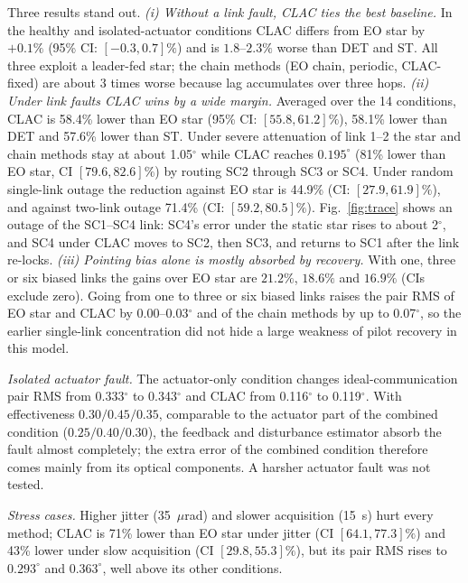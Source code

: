 \documentclass[journal]{IEEEtran}
\begin{document}
\begin{table}[!t]
\caption{CLAC minus baseline: paired change in pair RMS (\%), mean [95\% CI]. Negative values favour CLAC.}
\label{tab:contrast}
\centering\scriptsize

\end{table}

Three results stand out.
\emph{(i) Without a link fault, CLAC ties the best baseline.} In the healthy and isolated-actuator conditions CLAC differs from EO star by $+0.1\%$ (95\% CI: $[-0.3,0.7]\%$) and is $1.8$--$2.3\%$ worse than DET and ST. All three exploit a leader-fed star; the chain methods (EO chain, periodic, CLAC-fixed) are about 3 times worse because lag accumulates over three hops.
\emph{(ii) Under link faults CLAC wins by a wide margin.} Averaged over the 14 conditions, CLAC is 58.4\% lower than EO star (95\% CI: $[55.8, 61.2]\%$), 58.1\% lower than DET and 57.6\% lower than ST. Under severe attenuation of link 1--2 the star and chain methods stay at about 1.05$^\circ$ while CLAC reaches $0.195^\circ$ (81\% lower than EO star, CI $[79.6, 82.6]\%$) by routing SC2 through SC3 or SC4. Under random single-link outage the reduction against EO star is 44.9\% (CI: $[27.9, 61.9]\%$), and against two-link outage 71.4\% (CI: $[59.2, 80.5]\%$). Fig.~\ref{fig:trace} shows an outage of the SC1--SC4 link: SC4's error under the static star rises to about 2$^\circ$, and SC4 under CLAC moves to SC2, then SC3, and returns to SC1 after the link re-locks.
\emph{(iii) Pointing bias alone is mostly absorbed by recovery.} With one, three or six biased links the gains over EO star are $21.2\%$, $18.6\%$ and $16.9\%$ (CIs exclude zero). Going from one to three or six biased links raises the pair RMS of EO star and CLAC by 0.00--0.03$^\circ$ and of the chain methods by up to 0.07$^\circ$, so the earlier single-link concentration did not hide a large weakness of pilot recovery in this model.

\emph{Isolated actuator fault.} The actuator-only condition changes ideal-communication pair RMS from 0.333$^\circ$ to 0.343$^\circ$ and CLAC from 0.116$^\circ$ to 0.119$^\circ$. With effectiveness $0.30/0.45/0.35$, comparable to the actuator part of the combined condition ($0.25/0.40/0.30$), the feedback and disturbance estimator absorb the fault almost completely; the extra error of the combined condition therefore comes mainly from its optical components. A harsher actuator fault was not tested.

\emph{Stress cases.} Higher jitter (35~$\mu$rad) and slower acquisition (15~s) hurt every method; CLAC is 71\% lower than EO star under jitter (CI $[64.1, 77.3]\%$) and 43\% lower under slow acquisition (CI $[29.8, 55.3]\%$), but its pair RMS rises to $0.293^\circ$ and $0.363^\circ$, well above its other conditions.
\end{document}
